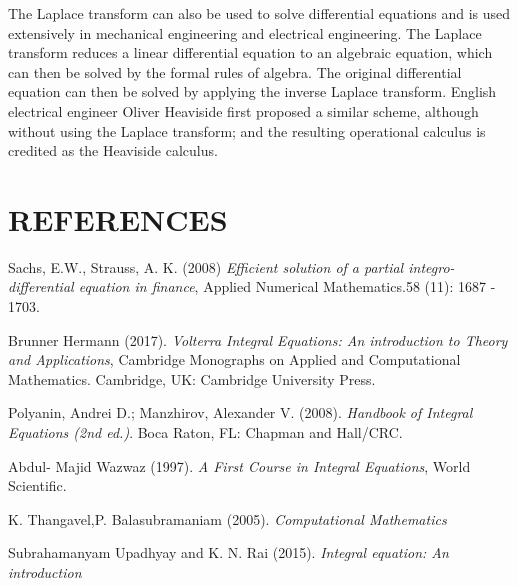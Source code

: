\documentclass[11pt]{report}
\begin{document}
	The Laplace transform can also be used to solve differential equations and is used extensively in mechanical engineering and electrical engineering. The Laplace transform reduces a linear differential equation to an algebraic equation, which can then be solved by the formal rules of algebra. The original differential equation can then be solved by applying the inverse Laplace transform. English electrical engineer Oliver Heaviside first proposed a similar scheme, although without using the Laplace transform; and the resulting operational calculus is credited as the Heaviside calculus.
 
	
	\chapter*{REFERENCES}
	
	\begin{description}
		\item Sachs, E.W., Strauss, A. K. (2008) \emph{Efficient solution of a partial integro-differential equation in finance}, Applied Numerical Mathematics.58 (11): 1687 - 1703.
		
		\item Brunner Hermann (2017). \emph{Volterra Integral Equations: An introduction to Theory and Applications}, Cambridge Monographs on Applied and Computational Mathematics. Cambridge, UK: Cambridge University Press.
		
		\item Polyanin, Andrei D.; Manzhirov, Alexander V. (2008).
		\emph{Handbook of Integral Equations (2nd ed.)}. Boca Raton, FL: Chapman and Hall/CRC.
		
		\item Abdul- Majid Wazwaz (1997). \emph{A First Course in Integral Equations}, World Scientific.
		
		\item K. Thangavel,P. Balasubramaniam (2005). \emph{Computational Mathematics}
		
		\item Subrahamanyam Upadhyay and K. N. Rai (2015). \emph{Integral equation: An introduction}
	\end{description}
	
\end{document}
